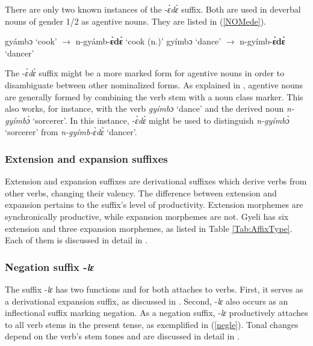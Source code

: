 There are only two known instances of the -{\itshape ɛ̀dɛ̀} suffix. Both are used in deverbal nouns of gender 1/2 as agentive nouns. They are listed in (\ref{NOMede}).

\begin{exe} \ex \label{NOMede}
\begin{xlist}
\ex gyámbɔ `cook' $\rightarrow$ n-gyámb-{\bfseries ɛ̀dɛ̀} `cook (n.)'
\ex gyímbɔ `dance' $\rightarrow$ n-gyímb-{\bfseries ɛ̀dɛ̀} `dancer'
\end{xlist}
\end{exe}

\noindent The -{\itshape ɛ̀dɛ̀} suffix might be a more marked form for agentive nouns in order to disambiguate between other nominalized forms. As explained in , agentive nouns are generally formed by combining the verb stem with a noun class marker. This also works, for instance, with the verb {\itshape gyímbɔ} `dance'  and the derived noun {\itshape n-gyímbɔ̀} `sorcerer'. In this instance, -{\itshape ɛ̀dɛ̀} might be used to distinguish   {\itshape n-gyímbɔ̀} `sorcerer' from {\itshape n-gyímb-ɛ̀dɛ̀} `dancer'.



\subsubsection{Extension and expansion suffixes}
\label{sec:EXtp}

Extension and expansion suffixes are derivational suffixes which derive verbs from other verbs, changing their valency. The difference between extension and expansion pertains to the suffix's level of productivity. Extension morphemes are synchronically productive, while expansion morphemes are not. Gyeli has six extension and three expansion morphemes, as listed in Table \ref{Tab:AffixType}. Each of them is discussed in detail in . 

\subsubsection{Negation suffix -{\itshape lɛ}}
\label{sec:NEGSuff}

The suffix -{\itshape lɛ} has two functions and for both attaches to verbs. First, it serves as a derivational expansion suffix, as discussed in . Second, -{\itshape lɛ} also occurs as an inflectional suffix marking negation. As a negation suffix, -{\itshape lɛ} productively attaches to all verb stems in the present tense, as exemplified in (\ref{negle}). Tonal changes depend on the verb's stem tones and are discussed in detail in .

